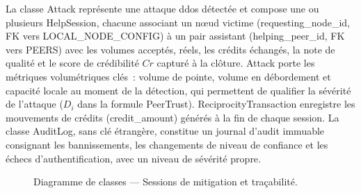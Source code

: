 La classe {Attack} représente une attaque \gls{ddos} détectée et compose une ou plusieurs {HelpSession}, chacune associant un nœud victime ({requesting\_node\_id}, FK vers {LOCAL\_NODE\_CONFIG}) à un pair assistant ({helping\_peer\_id}, FK vers {PEERS}) avec les volumes acceptés, réels, les crédits échangés, la note de qualité et le score de crédibilité $Cr$ capturé à la clôture. {Attack} porte les métriques volumétriques clés~: volume de pointe, volume en débordement et capacité locale au moment de la détection, qui permettent de qualifier la sévérité de l'attaque ($D_i$ dans la formule PeerTrust). {ReciprocityTransaction} enregistre les mouvements de crédits ({credit\_amount}) générés à la fin de chaque session. La classe {AuditLog}, sans clé étrangère, constitue un journal d'audit immuable consignant les bannissements, les changements de niveau de confiance et les échecs d'authentification, avec un niveau de sévérité propre.

\begin{figure}[H]
\centering
{}
\caption{Diagramme de classes — Sessions de mitigation et traçabilité.}
\label{fig:class_sessions}
\end{figure}


